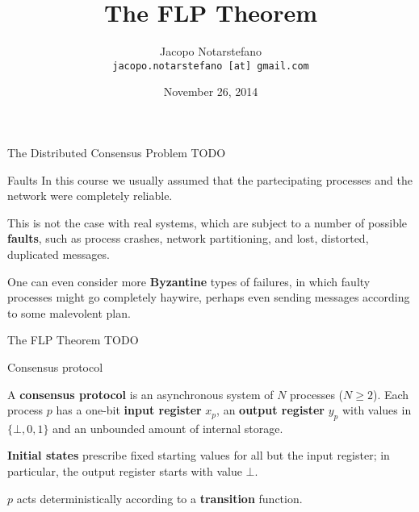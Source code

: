 \documentclass[12pt]{beamer}
\title{The FLP Theorem}
\author[Jacopo Notarstefano]{
  Jacopo Notarstefano\\
  \texttt{jacopo.notarstefano [at] gmail.com}
}
\date{November 26, 2014}
\begin{document}
  \begin{frame}[plain]
    \titlepage
  \end{frame}

  \begin{frame}{The Distributed Consensus Problem}
    TODO
  \end{frame}

  \begin{frame}{Faults}
    In this course we usually assumed that the partecipating processes and the network were completely reliable.

    \vspace{0.25cm}

    This is not the case with real systems, which are subject to a number of possible \textbf{faults}, such as process crashes, network partitioning, and lost, distorted, duplicated messages.

    \vspace{0.25cm}

    One can even consider more \textbf{Byzantine} types of failures, in which faulty processes might go completely haywire, perhaps even sending messages according to some malevolent plan.
  \end{frame}

  \begin{frame}{The FLP Theorem}
    TODO
  \end{frame}

  \begin{frame}{Consensus protocol}
    \begin{definition}
      A \textbf{consensus protocol} is an asynchronous system of \(N\) processes (\(N\ge 2\)). Each process \(p\) has a one-bit \textbf{input register} \(x_p\), an \textbf{output register} \(y_p\) with values in \(\{\bot, 0, 1\}\) and an unbounded amount of internal storage.
    \end{definition}

    \vspace{0.25cm}

    \textbf{Initial states} prescribe fixed starting values for all but the input register; in particular, the output register starts with value \(\bot\).

    \vspace{0.25cm}

    \(p\) acts deterministically according to a \textbf{transition} function.
  \end{frame}
\end{document}
